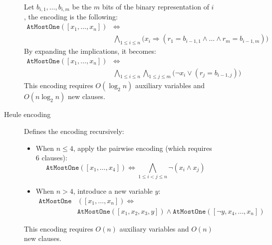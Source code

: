\begin{description}
\begin{description}
\begin{description}
                        Let $b_{i,1}, \dots, b_{i,m}$ be the $m$ bits of the binary representation of $i$, the encoding is the following:
                        \[
                            \begin{split}
                                \texttt{AtMostOne}([x_1, \dots, x_n]) &\iff \\
                                & \bigwedge_{1 \leq i \leq n} \big( x_i \Rightarrow (r_1 = b_{i-1,1} \land \dots \land r_m = b_{i-1,m}) \big)
                            \end{split}
                        \]
                        By expanding the implications, it becomes:
                        \[
                            \begin{split}
                                \texttt{AtMostOne}([x_1, \dots, x_n]) &\iff \\
                                & \bigwedge_{1 \leq i \leq n} \bigwedge_{1 \leq j \leq m} \big( \lnot x_i \vee (r_j = b_{i-1, j}) \big)
                            \end{split}
                        \]
                        This encoding requires $O(\log_2n)$ auxiliary variables and $O(n \log_2 n)$ new clauses.

                    \item[Heule encoding] 
                        Defines the encoding recursively:
                        \begin{itemize}
                            \item When $n \leq 4$, apply the pairwise encoding (which requires 6 clauses):
                                \[ \texttt{AtMostOne}([x_1, \dots, x_4]) \iff \bigwedge_{1 \leq i < j \leq n} \lnot (x_i \land x_j) \]
                            \item When $n > 4$, introduce a new variable $y$:
                                \[ 
                                    \begin{split}
                                        \texttt{AtMostOne}&([x_1, \dots, x_n]) \iff \\
                                        &\texttt{AtMostOne}([x_1, x_2, x_3, y]) \land \texttt{AtMostOne}([\lnot y, x_4, \dots, x_n]) 
                                    \end{split}
                                \]
                        \end{itemize}
                        This encoding requires $O(n)$ auxiliary variables and $O(n)$ new clauses.
                \end{description}
        \end{description}


\end{description}
